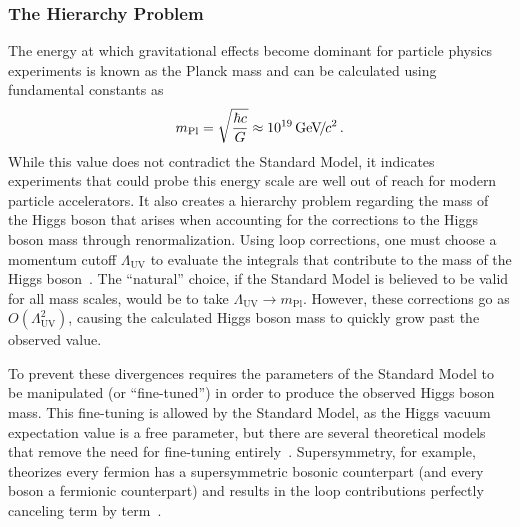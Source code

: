 \subsubsection{The Hierarchy Problem} \label{sec:hierarchy}
The energy at which gravitational effects become dominant for particle physics experiments is known as the Planck mass and can be calculated using fundamental constants as
\begin{equation}
	m_\text{Pl}=\sqrt{\frac{\hbar c}{G}}\approx10^{19}{\,\text{Ge\hspace{-.08em}V\hspace{-0.16em}/\hspace{-0.08em}}c^\text{2}}\,.
\end{equation}
While this value does not contradict the Standard Model, it indicates experiments that could probe this energy scale are well out of reach for modern particle accelerators. It also creates a hierarchy problem regarding the mass of the Higgs boson that arises when accounting for the corrections to the Higgs boson mass through renormalization. Using loop corrections, one must choose a momentum cutoff $\Lambda_\text{UV}$ to evaluate the integrals that contribute to the mass of the Higgs boson~\cite{Peskin:1995ev}. The ``natural'' choice, if the Standard Model is believed to be valid for all mass scales, would be to take $\Lambda_\text{UV}\to m_\text{Pl}$. However, these corrections go as $O(\Lambda_\text{UV}^2)$, causing the calculated Higgs boson mass to quickly grow past the observed value.

To prevent these divergences requires the parameters of the Standard Model to be manipulated (or ``fine-tuned'') in order to produce the observed Higgs boson mass. This fine-tuning is allowed by the Standard Model, as the Higgs vacuum expectation value is a free parameter, but there are several theoretical models that remove the need for fine-tuning entirely~\cite{hierarchy}. Supersymmetry, for example, theorizes every fermion has a supersymmetric bosonic counterpart (and every boson a fermionic counterpart) and results in the loop contributions perfectly canceling term by term~\cite{susy}.

